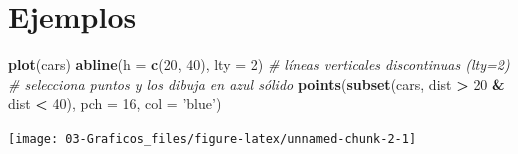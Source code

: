 \documentclass[]{book}
\newenvironment{Shaded}{\begin{snugshade}}{\end{snugshade}}
\newcommand{\KeywordTok}[1]{\textcolor[rgb]{0.13,0.29,0.53}{\textbf{#1}}}
\newcommand{\DataTypeTok}[1]{\textcolor[rgb]{0.13,0.29,0.53}{#1}}
\newcommand{\DecValTok}[1]{\textcolor[rgb]{0.00,0.00,0.81}{#1}}
\newcommand{\StringTok}[1]{\textcolor[rgb]{0.31,0.60,0.02}{#1}}
\newcommand{\CommentTok}[1]{\textcolor[rgb]{0.56,0.35,0.01}{\textit{#1}}}
\newcommand{\OperatorTok}[1]{\textcolor[rgb]{0.81,0.36,0.00}{\textbf{#1}}}
\newcommand{\NormalTok}[1]{#1}
\begin{document}
\section{Ejemplos}\label{ejemplos-1}

\begin{Shaded}
\begin{Highlighting}[]
\KeywordTok{plot}\NormalTok{(cars)}
\KeywordTok{abline}\NormalTok{(}\DataTypeTok{h =} \KeywordTok{c}\NormalTok{(}\DecValTok{20}\NormalTok{, }\DecValTok{40}\NormalTok{), }\DataTypeTok{lty =} \DecValTok{2}\NormalTok{) }\CommentTok{# líneas verticales discontinuas (lty=2)}
\CommentTok{# selecciona puntos y los dibuja en azul sólido}
\KeywordTok{points}\NormalTok{(}\KeywordTok{subset}\NormalTok{(cars, dist }\OperatorTok{>}\StringTok{ }\DecValTok{20} \OperatorTok{&}\StringTok{ }\NormalTok{dist }\OperatorTok{<}\StringTok{ }\DecValTok{40}\NormalTok{), }\DataTypeTok{pch =} \DecValTok{16}\NormalTok{, }\DataTypeTok{col =} \StringTok{'blue'}\NormalTok{) }
\end{Highlighting}
\end{Shaded}

\begin{center}\texttt{[image: 03-Graficos\_files/figure-latex/unnamed-chunk-2-1]} \end{center}
\end{document}
